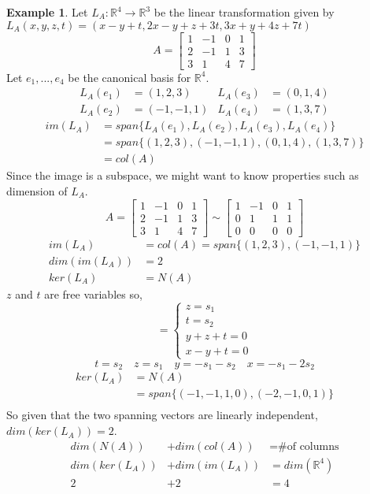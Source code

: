 \documentclass{report}
\theoremstyle{definition}
\newtheorem{ex}{Example}[section]
\theoremstyle{remark}
\begin{document}
\begin{ex}
Let $L_A:\mathbb{R}^4\rightarrow\mathbb{R}^3$ be the linear transformation given by $L_A(x,y,z,t)=(x-y+t,2x-y+z+3t,3x+y+4z+7t)$
\[A=
\begin{bmatrix}
1 & -1 & 0 & 1 \\
2 & -1 & 1 & 3 \\
3 & 1 & 4 & 7
\end{bmatrix}
\]
Let $e_1,...,e_4$ be the canonical basis for $\mathbb{R}^4$.
\begin{align*}
 L_A(e_1)&=(1,2,3) & L_A(e_3)&=(0,1,4) \\
 L_A(e_2)&=(-1,-1,1) & L_A(e_4)&=(1,3,7)
\end{align*}
\begin{align*}
 im(L_A)&=span\{L_A(e_1),L_A(e_2),L_A(e_3),L_A(e_4)\} \\
 &=span\{(1,2,3),(-1,-1,1),(0,1,4),(1,3,7)\}\\
 &=col(A)
\end{align*}
Since the image is a subspace, we might want to know properties such as dimension of $L_A$.
\[A=
\begin{bmatrix}
1 & -1 & 0 & 1 \\
2 & -1 & 1 & 3 \\
3 & 1 & 4 & 7
\end{bmatrix}
\sim
\begin{bmatrix}
\boxed{1} & -1 & 0 & 1 \\
0 & \boxed{1} & 1 & 1 \\
0 & 0 & 0 & 0
\end{bmatrix}
\]
\begin{align*}
 im(L_A)&=col(A)=span\{(1,2,3),(-1,-1,1)\}\\
 dim(im(L_A))&=2\\
 ker(L_A)&=N(A)
\end{align*}
$z$ and $t$ are free variables so,
\[=\left\lbrace
\begin{array}{l}
z=s_1\\
t=s_2\\
y+z+t=0\\
x-y+t=0
\end{array}\right.
\]
\[t=s_2\quad z=s_1\quad y=-s_1-s_2\quad x=-s_1-2s_2\]
\begin{align*}
 ker(L_A)&=N(A)\\
 &=span\{(-1,-1,1,0),(-2,-1,0,1)\}\\
\end{align*}
So given that the two spanning vectors are linearly independent, $dim(ker(L_A))=2$.
\begin{align*}
 dim(N(A))&+dim(col(A))&=\text{\# of columns}\\
 dim(ker(L_A))&+dim(im(L_A))&=dim(\mathbb{R}^4)\\
 2&+2&=4
\end{align*}
\end{ex}
\end{document}
